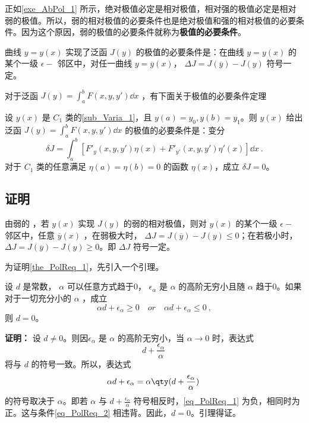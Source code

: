 

正如\autoref{exe_AbPol_1} 所示，绝对极值必定是相对极值，相对强的极值必定是相对弱的极值。所以，弱的相对极值的必要条件也是绝对极值和强的相对极值的必要条件。因为这个原因，弱的极值的必要条件就称为\textbf{极值的必要条件}。

曲线 $y=y(x)$ 实现了泛函 $J(y)$ 的极值的必要条件是：在曲线 $y=y(x)$ 的某个一级 $\epsilon-$ 邻区中，对任一曲线 $y=\overline{y}(x)$， $\Delta J=J(\overline{y})-J(y)$ 符号一定。

对于泛函 $J(y)=\int_a^bF(x,y,y')\dd x$ ，有下面关于极值的必要条件定理
\begin{theorem}{}\label{the_PolReq_1}
设 $y(x)$ 是 $C_1$ 类的\autoref{sub_Varia_1}，且 $y(a)=y_0,y(b)=y_1$。则 $y(x)$ 给出泛函 $J(y)=\int_a^bF(x,y,y')\dd x$ 的极值的必要条件是：变分
\begin{equation}
\delta J=\int_a^b[F'_y(x,y,y')\eta(x)+F'_{y'}(x,y,y')\eta'(x)]\dd x~.
\end{equation}
对于 $C_1$ 类的任意满足 $\eta(a)=\eta(b)=0$ 的函数 $\eta(x)$，成立 $\delta J=0$。
\end{theorem}
\subsection{证明}
由弱的 ，若 $y(x)$ 实现 $J(y)$ 的弱的相对极值，则对 $y(x)$ 的某个一级 $\epsilon-$ 邻区中，任意 $\overline{y}(x)$ ，在弱极大时， $\Delta J=J(\overline{y})-J(y)\leq 0$；在若极小时，$\Delta J=J(\overline{y})-J(y)\geq 0$。即 $\Delta J$ 符号一定。

为证明\autoref{the_PolReq_1}，先引入一个引理。
\begin{lemma}{}\label{lem_PolReq_1}
设 $d$ 是常数， $\alpha$ 可以任意方式趋于0， $\epsilon_\alpha$ 是 $\alpha$ 的高阶无穷小且随 $\alpha$ 趋于0。如果对于一切充分小的 $\alpha$ ，成立 
\begin{equation}\label{eq_PolReq_2}
\alpha d+\epsilon_\alpha\geq0\quad or\quad\alpha d+\epsilon_\alpha\leq0~,
\end{equation}
则 $d=0$。
\end{lemma}
\textbf{证明：} 设 $d\neq 0$。则因$\epsilon_\alpha$ 是 $\alpha$ 的高阶无穷小，当 $\alpha\rightarrow0$ 时，表达式
\begin{equation}
d+\frac{\epsilon_\alpha}{\alpha}~
\end{equation}
 将与 $d$ 的符号一致。所以，表达式
 \begin{equation}\label{eq_PolReq_1}
 \alpha d+\epsilon_\alpha=\alpha\qty(d+\frac{\epsilon_\alpha}{\alpha})~
 \end{equation}
 的符号取决于 $\alpha$。即若 $\alpha$ 与 $d+\frac{\epsilon_\alpha}{\alpha}$ 符号相反时，\autoref{eq_PolReq_1} 为负，相同时为正。这与条件\autoref{eq_PolReq_2} 相违背。因此，$d=0$。引理得证。
